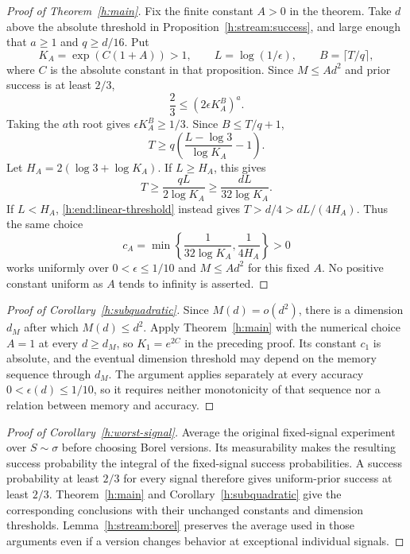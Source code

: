 \begin{proof}[Proof of Theorem~\ref{h:main}]
Fix the finite constant \(A>0\) in the theorem. Take \(d\) above
the absolute threshold in Proposition~\ref{h:stream:success}, and
large enough that \(a\ge1\) and \(q\ge d/16\). Put
\[
 K_A=\exp(C(1+A))>1,\qquad
 L=\log(1/\epsilon),\qquad B=\lceil T/q\rceil,
\]
where \(C\) is the absolute constant in that proposition. Since
\(M\le Ad^2\) and prior success is at least \(2/3\),
\[
 \frac23\le(2\epsilon K_A^B)^a.
\]
Taking the \(a\)th root gives \(\epsilon K_A^B\ge1/3\).
Since \(B\le T/q+1\),
\begin{equation}\label{h:end:rounding}
 T\ge q\left(\frac{L-\log3}{\log K_A}-1\right).
\end{equation}
Let \(H_A=2(\log3+\log K_A)\). If \(L\ge H_A\), this gives
\[
 T\ge\frac{qL}{2\log K_A}\ge\frac{dL}{32\log K_A}.
\]
If \(L<H_A\), \eqref{h:end:linear-threshold} instead gives
\(T>d/4>dL/(4H_A)\). Thus the same choice
\[
 c_A=\min\left\{\frac1{32\log K_A},\frac1{4H_A}\right\}>0
\]
works uniformly over \(0<\epsilon\le1/10\) and \(M\le Ad^2\)
for this fixed \(A\). No positive constant uniform as \(A\) tends
to infinity is asserted.
\end{proof}

\begin{proof}[Proof of Corollary~\ref{h:subquadratic}]
Since $M(d)=o(d^2)$, there is a dimension $d_M$ after which
$M(d)\le d^2$. Apply Theorem~\ref{h:main} with the numerical choice
$A=1$ at every $d\ge d_M$, so $K_1=e^{2C}$ in the preceding proof.
Its constant $c_1$ is absolute, and the
eventual dimension threshold may depend on the memory sequence
through $d_M$. The argument applies separately at every accuracy
$0<\epsilon(d)\le1/10$, so it requires neither monotonicity of that
sequence nor a relation between memory and accuracy.
\end{proof}

\begin{proof}[Proof of Corollary~\ref{h:worst-signal}]
Average the original fixed-signal experiment over $S\sim\sigma$
before choosing Borel versions. Its measurability makes the resulting
success probability the integral of the fixed-signal success
probabilities. A success probability at least $2/3$ for every
signal therefore gives uniform-prior success at least $2/3$.
Theorem~\ref{h:main} and Corollary~\ref{h:subquadratic} give the
corresponding conclusions with their unchanged constants and
dimension thresholds. Lemma~\ref{h:stream:borel} preserves the
average used in those arguments even if a version changes behavior
at exceptional individual signals.
\end{proof}
